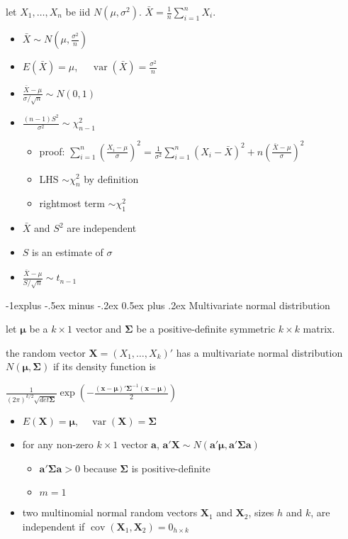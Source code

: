 \documentclass[10pt, landscape]{article}
\makeatletter
\renewcommand{\subsection}{\@startsection{subsection}{2}{0mm}%
  {-1explus -.5ex minus -.2ex}%
  {0.5ex plus .2ex}%
{\normalfont\normalsize\bfseries}}
\newcommand{\cov}{\mathop{\mathrm{cov}}}
\newcommand{\var}{\mathop{\mathrm{var}}}
\makeatother
\begin{document}
\begin{multicols*}{4}
  let $X_1, \dots, X_n$ be iid $N(\mu, \sigma^2)$. $\bar{X} = \frac{1}{n} \sum^n_{i=1} X_i$. 
  \begin{itemize}
    \item $\bar{X} \sim N(\mu, \frac{\sigma^2}{n})$
    \item $E(\bar{X}) = \mu$, $\quad\var(\bar{X}) = \frac{\sigma^2}{n}$
    \item $\frac{\bar{X} - \mu}{\sigma/\sqrt{n}} \sim N(0,1)$
    \item $\frac{(n-1)S^2}{\sigma^2} \sim \chi^2_{n-1}$
      \begin{itemize}
        \item proof: $\sum^n_{i=1}(\frac{X_i - \mu}{\sigma})^2 = \frac{1}{\sigma^2} \sum^n_{i=1} (X_i-\bar{X})^2 + n(\frac{\bar{X} - \mu}{\sigma})^2$
        \item LHS $\sim\chi^2_n$ by definition
        \item rightmost term $\sim\chi^2_1$
      \end{itemize}
    \item $\bar{X}$ and $S^2$ are independent
    \item $S$ is an estimate of $\sigma$
    \item $\frac{\bar{X} - \mu}{S/\sqrt{n}} \sim t_{n-1}$
  \end{itemize}

  \subsection{Multivariate normal distribution}

  let $\mathbf{\mu}$ be a $k \times 1$ vector and $\mathbf{\Sigma}$ be a positive-definite symmetric $k \times k$ matrix.

  \begin{tightcenter}
    the random vector $\mathbf{X} = (X_1, \dots, X_k)'$ has a multivariate normal distribution $N(\mathbf{\mu}, \mathbf{\Sigma})$ if its density function is 

    \( {\displaystyle{ \frac{1}{(2\pi)^{k/2} \sqrt{det\mathbf{\Sigma}}} \exp \left(-\frac{(\mathbf{x} - \mathbf{\mu})' \mathbf{\Sigma}^{-1}(\mathbf{x} - \mathbf{\mu})}{2}\right) }} \) 
  \end{tightcenter}

  \begin{itemize}
    \item $E(\mathbf{X}) = \mathbf{\mu}, \quad \var(\mathbf{X}) = \mathbf{\Sigma}$
    \item for any non-zero $k \times 1 $ vector $\mathbf{a}$, 
      $\mathbf{a'X} \sim N(\mathbf{a'\mu}, \mathbf{a'\Sigma a})$
      \begin{itemize}
        \item $\mathbf{a}'\mathbf{\Sigma a} > 0$ because $\mathbf{\Sigma}$ is positive-definite
        \item $m=1$
      \end{itemize}
    \item two multinomial normal random vectors $\mathbf{X}_1$ and $\mathbf{X}_2$, sizes $h$ and $k$, are independent if $\cov (\mathbf{X}_1, \mathbf{X}_2) = 0_{h \times k}$
  \end{itemize}


\end{multicols*}
\end{document}
